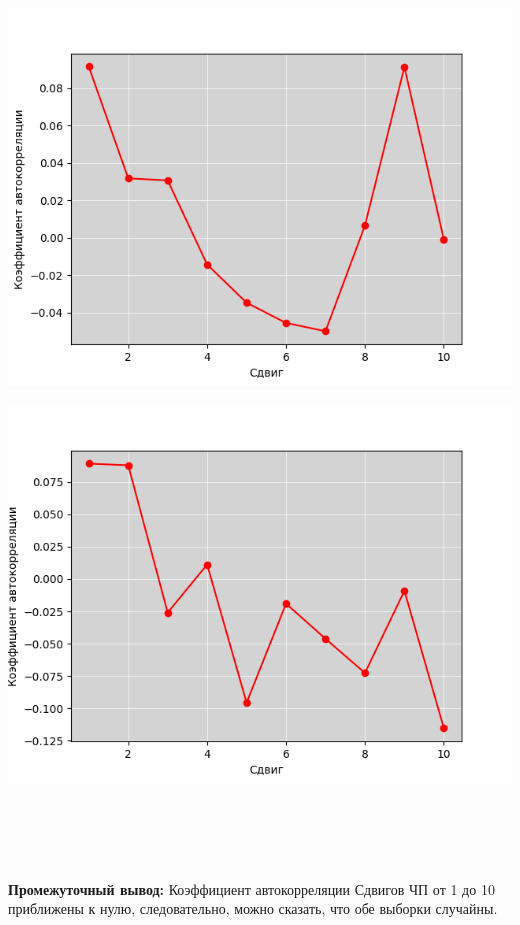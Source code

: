 \documentclass{article}
\begin{document}
\begin{minipage}{.48\textwidth}
    \centering
    \includegraphics[width=.9\textwidth]{4}
\end{minipage}
\hfill
\begin{minipage}{.48\textwidth}
    \centering
    \includegraphics[width=.9\textwidth]{5}
\end{minipage}
\\ \\
\\ \\
\textbf{Промежуточный вывод:}
Коэффициент автокорреляции Сдвигов ЧП от 1 до 10 приближены к нулю,
следовательно, можно сказать, что обе выборки случайны.
\end{document}
